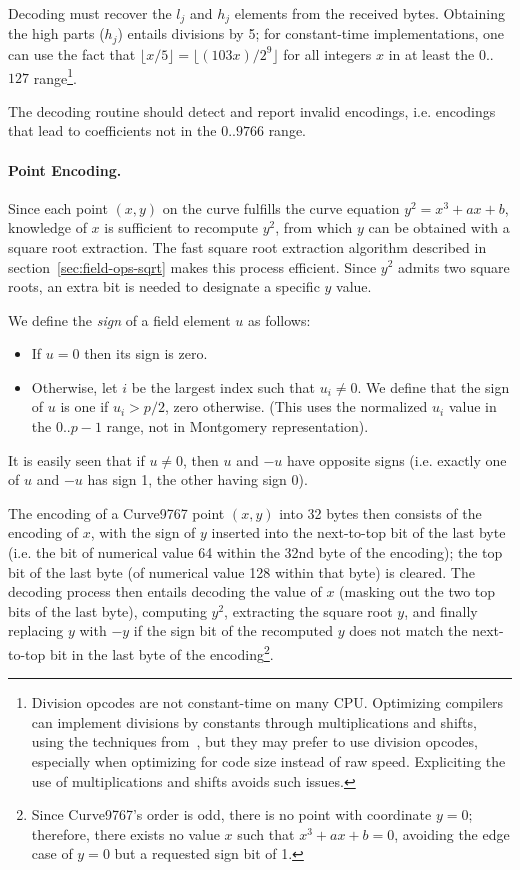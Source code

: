 \documentclass{llncs}
\begin{document}
Decoding must recover the $l_j$ and $h_j$ elements from the received
bytes. Obtaining the high parts ($h_j$) entails divisions by 5; for
constant-time implementations, one can use the fact that $\lfloor x/5
\rfloor = \lfloor (103x)/2^9 \rfloor$ for all integers $x$ in at least
the $0$..$127$ range\footnote{Division opcodes are not constant-time on
many CPU. Optimizing compilers can implement divisions by constants
through multiplications and shifts, using the techniques
from~\cite{GraMon1994}, but they may prefer to use division opcodes,
especially when optimizing for code size instead of raw speed.
Expliciting the use of multiplications and shifts avoids such issues.}.

The decoding routine should detect and report invalid encodings, i.e.
encodings that lead to coefficients not in the $0$..$9766$ range.

\paragraph{Point Encoding.}

Since each point $(x,y)$ on the curve fulfills the curve equation $y^2 =
x^3 + ax + b$, knowledge of $x$ is sufficient to recompute $y^2$, from
which $y$ can be obtained with a square root extraction. The fast square
root extraction algorithm described in section~\ref{sec:field-ops-sqrt}
makes this process efficient. Since $y^2$ admits two square roots, an
extra bit is needed to designate a specific $y$ value.

We define the \emph{sign} of a field element $u$ as follows:
\begin{itemize}

    \item If $u = 0$ then its sign is zero.

    \item Otherwise, let $i$ be the largest index such that $u_i \neq 0$.
    We define that the sign of $u$ is one if $u_i > p/2$, zero otherwise.
    (This uses the normalized $u_i$ value in the $0$..$p-1$ range, not
    in Montgomery representation).

\end{itemize}
It is easily seen that if $u\neq 0$, then $u$ and $-u$ have opposite signs
(i.e. exactly one of $u$ and $-u$ has sign 1, the other having sign 0).

The encoding of a Curve9767 point $(x,y)$ into 32 bytes then consists of
the encoding of $x$, with the sign of $y$ inserted into the next-to-top
bit of the last byte (i.e. the bit of numerical value 64 within the 32nd
byte of the encoding); the top bit of the last byte (of numerical value
128 within that byte) is cleared. The decoding process then entails
decoding the value of $x$ (masking out the two top bits of the last
byte), computing $y^2$, extracting the square root $y$, and finally
replacing $y$ with $-y$ if the sign bit of the recomputed $y$ does not
match the next-to-top bit in the last byte of the
encoding\footnote{Since Curve9767's order is odd, there is no point with
coordinate $y = 0$; therefore, there exists no value $x$ such that
$x^3+ax+b = 0$, avoiding the edge case of $y = 0$ but a requested sign
bit of 1.}.
\end{document}
